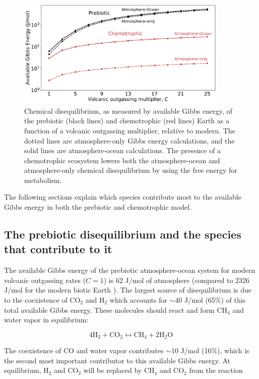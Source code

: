 \begin{figure}
  \centering
  \includegraphics[width=0.9\textwidth]{tex/2diseq/Figure2.pdf}
  \caption{Chemical disequilibrium, as measured by available Gibbs energy, of the prebiotic (black lines) and chemotrophic (red lines) Earth as a function of a volcanic outgassing multiplier, relative to modern. The dotted lines are atmosphere-only Gibbs energy calculations, and the solid lines are atmosphere-ocean calculations. The presence of a chemotrophic ecosystem lowers both the atmosphere-ocean and atmosphere-only chemical disequilibrium by using the free energy for metabolism.}
  \label{fig:diseq_figure2}
\end{figure}

The following sections explain which species contribute most to the available Gibbs energy in both the prebiotic and chemotrophic model.

\subsection{The prebiotic disequilibrium and the species that contribute to it}

The available Gibbs energy of the prebiotic atmosphere-ocean system for modern volcanic outgassing rates ($C = 1$) is 62 J/mol of atmosphere (compared to 2326 J/mol for the modern biotic Earth \citep{KrissansenTotton_2016}). The largest source of disequilibrium is due to the coexistence of CO$_2$ and H$_2$ which accounts for $\sim 40$ J/mol (65\%) of this total available Gibbs energy. These molecules should react and form CH$_4$ and water vapor in equilibrium:

\begin{equation}
  4 \mathrm{H_2} + \mathrm{CO_2} \leftrightarrow \mathrm{CH_4} + 2 \mathrm{H_2O}
\end{equation}

The coexistence of CO and water vapor contributes $\sim 10$ J/mol (16\%), which is the second most important contributor to this available Gibbs energy. At equilibrium, H$_2$ and CO$_2$ will be replaced by CH$_4$ and CO$_2$ from the reaction

